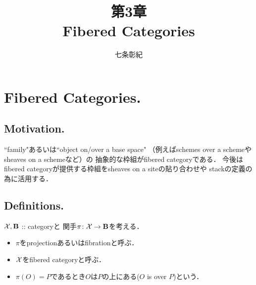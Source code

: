 
\newcommand{\HOM}{\operatorname{HOM}}


\title{第3章 \\ Fibered Categories}
\author{七条彰紀}
\maketitle
\tableofcontents
\vspace{10pt}

\section{Fibered Categories.}
\subsection{Motivation.}
    ``family"あるいは``object on/over a base space"
    （例えばschemes over a schemeやsheaves on a schemeなど）の
    抽象的な枠組がfibered categoryである．
    今後はfibered categoryが提供する枠組をsheaves on a siteの貼り合わせや
    stackの定義の為に活用する．

\subsection{Definitions.}
    $\mathcal{X}, \mathbf{B}$ :: categoryと
    関手$\pi \colon \mathcal{X} \to \mathbf{B}$を考える．
    \begin{itemize}
    \item 
        $\pi$をprojectionあるいはfibrationと呼ぶ．
    \item
        $\mathcal{X}$をfibered categoryと呼ぶ．
    \item
        $\pi(O)=P$であるとき$O$は$P$の上にある($O$ is over $P$)という．
    \end{itemize}

